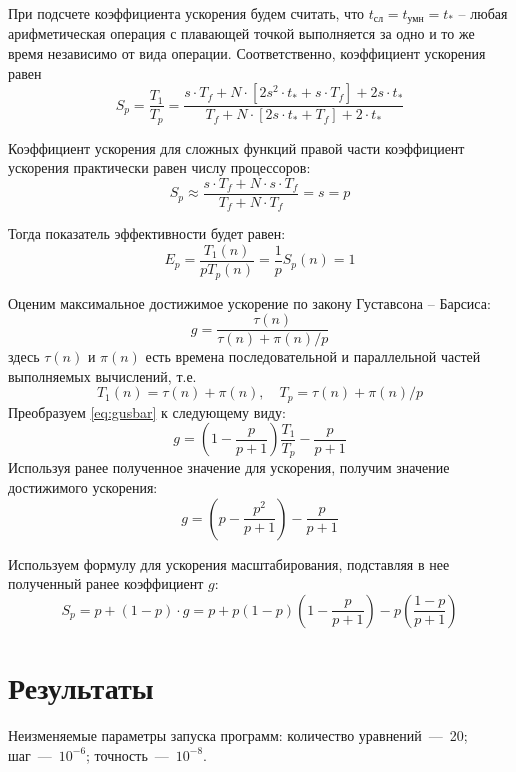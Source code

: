 \documentclass[14pt,final,titlepage,pscyr]{hedwork}
\begin{document}
При подсчете коэффициента ускорения будем считать, что
\( t_\text{сл} = t_\text{умн} = t_* \) -- любая арифметическая операция с плавающей
точкой выполняется за одно и то же время независимо от вида операции.
Соответственно, коэффициент ускорения равен
\[
	S_p = \frac{T_1}{T_p} =
	  \frac{s\cdot T_f + N\cdot\left[ 2s^2 \cdot t_* + s\cdot T_f\right] + 2s\cdot t_*}
	  {T_f + N\cdot\left[ 2s\cdot t_* + T_f\right] + 2\cdot t_*}
\]

Коэффициент ускорения для сложных функций правой части коэффициент ускорения
практически равен числу процессоров:
\[
	S_p \approx \frac{s \cdot T_f + N \cdot s \cdot T_f}{T_f + N \cdot T_f } = s = p
\]

Тогда показатель эффективности будет равен:
\[
	E_p = \frac{T_1(n)}{pT_p(n)} = \frac{1}{p}S_p(n) = 1
\]

Оценим максимальное достижимое ускорение по закону Густавсона -- Барсиса:
\begin{equation}
	g = \frac{\tau(n)}{\tau(n) + \pi(n) / p}
	\label{eq:gusbar}
\end{equation}
здесь \( \tau(n) \) и \( \pi(n) \) есть времена последовательной и параллельной
частей выполняемых вычислений, т.е. 
\[
	T_1(n) = \tau(n) + \pi(n), \quad T_p = \tau(n) + \pi(n) / p
\]
Преобразуем \eqref{eq:gusbar} к следующему виду:
\[
	g = \left( 1 - \frac{p}{p+1} \right)\frac{T_1}{T_p} - \frac{p}{p+1}
\]
Используя ранее полученное значение для ускорения, получим значение достижимого ускорения:
\[
	g = \left( p - \frac{p^2}{p+1} \right) - \frac{p}{p+1}
\]

Используем формулу для ускорения масштабирования,
подставляя в нее полученный ранее коэффициент \( g \):
\[
	S_p = p + (1-p)\cdot g = p + p \left( 1 - p \right) \left( 1 - \frac{p}{p+1} \right) - 
		p\left( \frac{1-p}{p+1} \right)
\]

\newpage

\section{Результаты}
Неизменяемые параметры запуска программ:
количество уравнений~---~20;
шаг~---~\( 10^{-6} \);
точность~---~\( 10^{-8} \).
\end{document}
